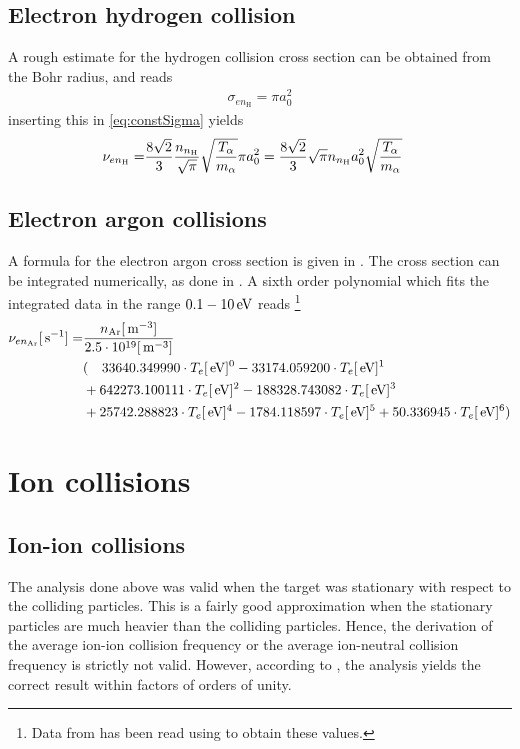 \subsection{Electron hydrogen collision}
A rough estimate for the hydrogen collision cross section can be obtained from the Bohr radius, and reads
%
\begin{align*}
    \sigma_{en_\text{H}} = \pi a_0^2
\end{align*}
%
inserting this in \cref{eq:constSigma} yields
%
\begin{align*}
    \nu_{en_\text{H}}
    =&
    \frac{8\sqrt{2}}{3}
    \frac{n_{n_\text{H}} }{\sqrt{\pi}}
    \sqrt{ \frac{T_\alpha}{m_\alpha}}
    \pi a_0^2
    =
    \frac{8\sqrt{2}}{3}
    \sqrt{\pi} n_{n_\text{H}}  a_0^2
    \sqrt{ \frac{T_\alpha}{m_\alpha}}
\end{align*}
%

\subsection{Electron argon collisions}
%
A formula for the electron argon cross section is given in \cite{Hayashi1981}.
The cross section can be integrated numerically, as done in \cite{Schroder2003Phd}.
A sixth order polynomial which fits the integrated data in the range $0.1 - 10 \, \text{eV}$ reads%
%
\footnote{Data from \cite{Schroder2003Phd} has been read using \cite{Ankit2016Web} to obtain these values.}
%
\begin{align*}
    \nu_{en_\text{Ar}}[\, \text{s}^{-1}]
    =&
    \frac{n_{\text{Ar}}[\, \text{m}^{-3}]}{2.5\cdot10^{19}[\, \text{m}^{-3}]}
    \\
    &
    (
    \quad 33640.349990\cdot T_e[\, \text{eV}]^0 -33174.059200\cdot T_e[\, \text{eV}]^1\\
&+642273.100111\cdot T_e[\, \text{eV}]^2 -188328.743082\cdot T_e[\, \text{eV}]^3\\
&+25742.288823\cdot T_e[\, \text{eV}]^4 -1784.118597\cdot T_e[\, \text{eV}]^5 +50.336945\cdot T_e[\, \text{eV}]^6)
\end{align*}

\section{Ion collisions}
\label{sec:nui}
%
\subsection{Ion-ion collisions}
The analysis done above was valid when the target was stationary with respect to the colliding particles.
This is a fairly good approximation when the stationary particles are much heavier than the colliding particles.
Hence, the derivation of the average ion-ion collision frequency or the average ion-neutral collision frequency is strictly not valid.
However, according to \cite{Goldston1995book}, the analysis yields the correct result within factors of orders of unity.

